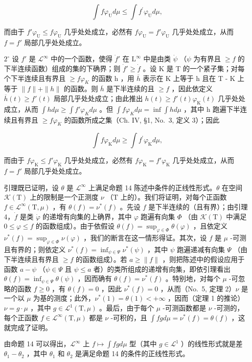 \[
\int f \varphi_ {\mathrm{U}} d \mu \leqslant \int f ^ {\prime} \varphi_ {\mathrm{U}} d \mu ,
\]

而由于 \(f' \varphi_{\mathrm{U}} \leqslant f \varphi_{\mathrm{U}}\) 几乎处处成立，必然有 \(f \varphi_{\mathrm{U}} = f' \varphi_{\mathrm{U}}\) 几乎处处成立，从而 \(f = f'\) 局部几乎处处成立。

\(2^{\circ}\) 设 \(f'\) 是 \(\mathcal{L}^{\infty}\) 中的一个函数，使得 \(\dot{f}'\) 在 \(\mathrm{L}^{\infty}\) 中是由类 \(\dot{\psi}\) （\(\psi\) 为有界且 \(\geqslant f\) 的下半连续函数）组成的集的下确界；则 \(\dot{f}' \geqslant \dot{f}\) 。设 K 是 T 的一个紧子集；对每个下半连续且有界且 \(\geqslant f\varphi_{K}\) 的函数 h ，用 \(\overline{h}\) 表示在 K 上等于 h 且在 T - K 上等于 \(\|f\| + \|h\|\) 的函数。则 \(\overline{h}\) 是下半连续的且 \(\geqslant f\) ，因此依定义 \(\overline{h}(t) \geqslant f'(t)\) 局部几乎处处成立；由此推出 \(h(t) \geqslant f'(t)\varphi_{\mathrm{K}}(t)\) 几乎处处成立，从而 \(\int h d\mu \geqslant \int f'\varphi_{K} d\mu\) 。但 \(\int f\varphi_{K} d\mu = \inf \int h d\mu\) ，其中 h 跑遍下半连续且有界且 \(\geqslant f\varphi_{K}\) 的函数所成之集（Ch. IV, §1, No.~3, 定义 3）；因此

\[
\int f \varphi_ {\mathrm{K}} d \mu \geqslant \int f ^ {\prime} \varphi_ {\mathrm{K}} d \mu ,
\]

而由于 \(f\varphi_{\mathrm{K}} \leqslant f'\varphi_{\mathrm{K}}\) 几乎处处成立，必然有 \(f\varphi_{\mathrm{K}} = f'\varphi_{\mathrm{K}}\) 几乎处处成立，从而 \(f = f'\) 局部几乎处处成立。

引理既已证明，设 \(\theta\) 是 \(\mathcal{L}^{\infty}\) 上满足命题 14 陈述中条件的正线性形式。\(\theta\) 在空间 \(\mathcal{K}(\mathrm{T})\) 上的限制是一个正测度 \(\nu\) （\(\mathrm{T}\) 上的）。我们将证明，对每个正函数 \(f\in \mathcal{L}^{\infty}(\mathrm{T},\mu)\) ，有 \(\theta (f) = \nu^{*}(f)\) 。先设 \(f\) 是下半连续的（且有界）；由引理 4，\(\dot{f}\) 是类 \(\dot{\varphi}\) 的递增有向集的上确界，其中 \(\varphi\) 跑遍有向集 \(\Phi\) （由 \(\mathcal{K}(\mathrm{T})\) 中满足 \(0\leqslant \varphi \leqslant f\) 的函数组成）。由于依假设 \(\theta (f) = \sup_{\varphi \in \Phi}\theta (\varphi)\) ，且依定义 \(\nu^{*}(f) = \sup_{\varphi \in \Phi}\nu (\varphi)\) ，我们的断言在这一情形得证。其次，设 \(f\) 是 \(\mu\) -可测且有界的；则依定义 \(\nu^{*}(f) = \inf_{\psi \in \Psi}\nu^{*}(\psi)\) ，其中 \(\psi\) 跑遍递减有向集 \(\Psi\) （由下半连续且有界且 \(\geqslant f\) 的函数组成）。若 \(a\geqslant \| f\|\) ，则把陈述中的假设应用于函数 \(a - \psi\) （\(\psi \in \Psi\) 且 \(\psi \leqslant a\) 者）的类所组成的递增有向集，即依引理看出 \(\theta (f) = \inf_{\psi \in \Psi}\theta (\psi)\) ，因而确有 \(\theta (f) = \nu^{*}(f)\) 。特别地，对每个 \(\mu\) -可忽略的函数 \(f\geqslant 0\) ，有 \(\theta (f) = 0\) ，因此 \(\nu^{*}(f) = 0\) ，从而（No.~5, 定理 2）\(\nu\) 是一个以 \(\mu\) 为基的测度；此外，\(\nu^{*}(1) = \theta (1) < +\infty\) ，因而（定理 1 的推论）\(\nu = g\cdot \mu\) ，其中 \(g\in \mathcal{L}^1 (\mathrm{T},\mu)\) 。最后，由于每个 \(\mu\) -可测函数都是 \(\nu\) -可测的，每个正函数 \(f\in \mathcal{L}^{\infty}(\mathrm{T},\mu)\) 都是 \(\nu\) -可积的，且 \(\int fg d\mu = \nu^{*}(f) = \theta (f)\) ，这就完成了证明。

由命题 14 可以得出，\(\mathcal{L}^{\infty}\) 上 \(f\mapsto \int fg d\mu\) 型（其中 \(g\in \mathcal{L}^{1}\) ）的线性形式就是差 \(\theta_{1} - \theta_{2}\) ，其中 \(\theta_{1}\) 和 \(\theta_{2}\) 是满足命题 14 的条件的正线性形式。

